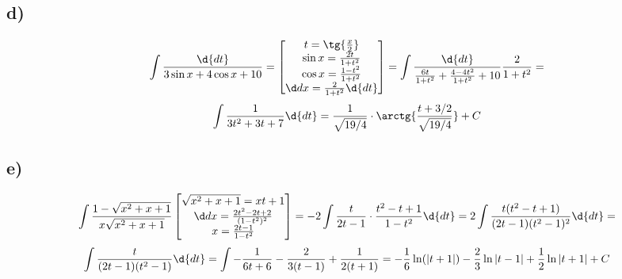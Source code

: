 	\subsection*{d)}
	$$\int\frac{\d{dt}}{3\sin x+ 4\cos x + 10} = \begin{bmatrix}
		t =\tg{\frac x2}\\
		\sin x = \frac{2t}{1+t^2} \\
		\cos x = \frac{1-t^2}{1+t^2}\\
		\dx = \frac{2}{1+t^2}\d{dt}
	\end{bmatrix} = \int \frac{\d{dt}}{\frac{6t}{1+t^2}+\frac{4-4t^2}{1+t^2} + 10} \frac{2}{1+t^2} =$$ $$ \int\frac{1}{3t^2+3t+7}\d{dt} = \frac{1}{\sqrt{19/4}}\cdot \arctg{\frac{t+3/2}{\sqrt{19/4}}} + C$$
	\subsection*{e)}
	$$\int \frac{1-\sqrt{x^2+x+1}}{x\sqrt{x^2+x+1}}\begin{bmatrix} \sqrt{x^2+x+1} = xt+1 \\
		\dx = \frac{2t^2-2t+2}{(1-t^2)^2} \\
		x = \frac{2t-1}{1-t^2}
	\end{bmatrix} = -2\int \frac{t}{2t-1} \cdot \frac{t^2-t+1}{1-t^2}\d{dt} = 2\int\frac{t(t^2-t+1)}{(2t-1)(t^2-1)^2}\d{dt} = $$ 
	$$\int \frac{t}{(2t-1)(t^2-1)}\d{dt} = \int -\frac{1}{6t+6} - \frac{2}{3(t-1)} + \frac{1}{2(t+1)} = -\frac16\ln(|t+1|) - \frac23\ln{|t-1|} + \frac12\ln{|t+1|}+C$$
